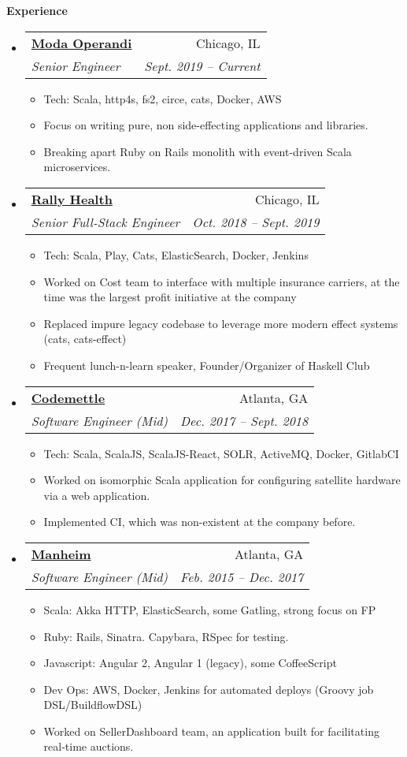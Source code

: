 \documentclass[letterpaper,11pt]{article}
\makeatletter
\newcommand{\resitem}[1]{\item #1 \vspace{-2pt}}
\newcommand{\resheading}[1]{{\large \colorbox{mygrey}{\begin{minipage}{\textwidth}{\textbf{#1 \vphantom{p\^{E}}}}\end{minipage}}}}
\newcommand{\ressubheading}[4]{
\begin{tabular*}{6.5in}{l@{\extracolsep{\fill}}r}
		\textbf{#1} & #2 \\
		\textit{#3} & \textit{#4} \\
\end{tabular*}\vspace{-6pt}}
\makeatother
\begin{document}
\resheading{Experience}
\begin{itemize}
\item
  \ressubheading{\href{http://www.modaoperandi.com/}{Moda Operandi}}{Chicago, IL}{Senior Engineer}{Sept. 2019 -- Current}
    { \footnotesize
    \begin{itemize}
        \resitem{Tech: Scala, http4s, fs2, circe, cats, Docker, AWS}
        \resitem{Focus on writing pure, non side-effecting applications and libraries.}
        \resitem{Breaking apart Ruby on Rails monolith with event-driven Scala microservices.}
    \end{itemize}
    }
\item
  \ressubheading{\href{http://www.rallyhealth.com/}{Rally Health}}{Chicago, IL}{Senior Full-Stack Engineer}{Oct. 2018 -- Sept. 2019}
    { \footnotesize
    \begin{itemize}
        \resitem{Tech: Scala, Play, Cats, ElasticSearch, Docker, Jenkins}
        \resitem{Worked on Cost team to interface with multiple insurance carriers, at the time was the largest profit initiative at the company}
        \resitem{Replaced impure legacy codebase to leverage more modern effect systems (cats, cats-effect)}
        \resitem{Frequent lunch-n-learn speaker, Founder/Organizer of Haskell Club}
    \end{itemize}
    }
\item
  \ressubheading{\href{http://www.codemettle.com/}{Codemettle}}{Atlanta, GA}{Software Engineer (Mid)}{Dec. 2017 -- Sept. 2018}
    { \footnotesize
    \begin{itemize}
        \resitem{Tech: Scala, ScalaJS, ScalaJS-React, SOLR, ActiveMQ, Docker, GitlabCI}
        \resitem{Worked on isomorphic Scala application for configuring satellite hardware via a web application.}
        \resitem{Implemented CI, which was non-existent at the company before.}
    \end{itemize}
    }
\item
  \ressubheading{\href{http://www.manheim.com/}{Manheim}}{Atlanta, GA}{Software Engineer (Mid)}{Feb. 2015 -- Dec. 2017}
    { \footnotesize
    \begin{itemize}
        \resitem{Scala: Akka HTTP, ElasticSearch, some Gatling, strong focus on FP}
        \resitem{Ruby: Rails, Sinatra. Capybara, RSpec for testing.}
        \resitem{Javascript: Angular 2, Angular 1 (legacy), some CoffeeScript}
        \resitem{Dev Ops: AWS, Docker, Jenkins for automated deploys (Groovy job DSL/BuildflowDSL)}
        \resitem{Worked on SellerDashboard team, an application built for facilitating real-time auctions.
}
\end{itemize}}
\end{itemize}
\end{document}
